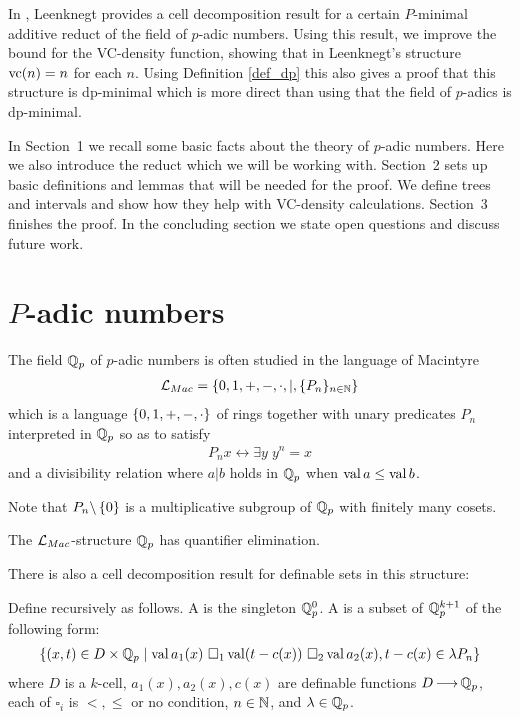 In \cite{reduct}, Leenknegt provides a cell decomposition result for a certain $P$-minimal additive reduct of the field of $p$-adic numbers.
Using this result, we improve the bound for the VC-density function, showing that in Leenknegt's structure $\operatorname{vc}(n) = n$ for each $n$.
Using Definition \ref{def_dp} this also gives a proof that this structure is dp-minimal which is more direct than using that the field of $p$-adics is dp-minimal.

In Sec\-tion~1 we recall some basic facts about the theory of $p$-adic numbers.
Here we also introduce the reduct which we will be working with.
Sec\-tion~2 sets up basic definitions and lemmas that will be needed for the proof.
We define trees and intervals and show how they help with VC-density calculations. 
Sec\-tion~3 finishes the proof.
In the concluding section we state open questions and discuss future work.

\section{$P$-adic numbers}
The field $\mathbb{Q}_p$ of $p$-adic numbers is often studied in the language of Macintyre 
  \begin{align*}
	\mathcal L_{Mac} = \left\{0, 1, +, -, \cdot, |, \{P_n\}_{n \in \mathbb{N}}\right\}
  \end{align*}
which is a language $\left\{0, 1, +, -, \cdot\right\}$ of rings together with unary predicates $P_n$ interpreted in $\mathbb{Q}_p$ so as to satisfy
\begin{align*}
  P_n x \leftrightarrow \exists y \; y^n = x
\end{align*}
and a divisibility relation where $a|b$ holds in $\mathbb{Q}_p$ when $\operatorname{val} a \leq \operatorname{val} b$.

Note that $P_n\backslash \left\{0\right\}$ is a multiplicative subgroup of $\mathbb{Q}_p$ with finitely many cosets.
\begin{Theorem} 
  The $\mathcal L_{Mac}$-structure $\mathbb{Q}_p$ has quantifier elimination.
\end{Theorem}

There is also a cell decomposition result for definable sets in this structure:
\begin{Definition}
  Define  recursively as follows.
  A  is the singleton $\mathbb{Q}_p^0$.
  A  is a subset of $\mathbb{Q}_p^{k+1}$ of the following form:
  \begin{align*}
    \left\{(x, t) \in D \times \mathbb{Q}_p \mid \operatorname{val} a_1(x) \ \square_1 \operatorname{val} (t - c(x)) \ \square_2 \operatorname{val} a_2(x), t - c(x) \in \lambda P_n\right\}
  \end{align*}
  where $D$ is a $k$-cell,
  $a_1(x), a_2(x), c(x)$ are definable functions $D \operatorname{\longrightarrow} \mathbb{Q}_p$,
  each of $\square_i$ is $<, \leq$ or no condition,
  $n \in \mathbb{N}$,
  and
  $\lambda \in \mathbb{Q}_p$.    
\end{Definition}

